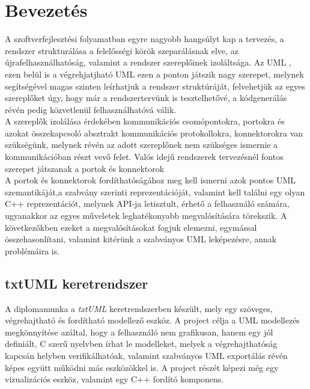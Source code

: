 \documentclass[a4paper,12pt]{report}
\begin{document}
\tableofcontents

\chapter{Bevezetés}
A szoftverfejlesztési folyamatban egyre nagyobb hangsúlyt kap a tervezés, a rendszer strukturálása a felelősségi körök szeparálásnak elve, az újrafelhasználhatóság, valamint a rendszer szereplőinek izoláltsága. Az UML \cite{uml_omg}, ezen belül is a végrehjatjható UML ezen a ponton játszik nagy szerepet, melynek segítségével magas szinten leírhatjuk a rendszer struktúráját, felvehetjük az egyes szereplőket úgy, hogy már a rendszertervünk is tesztelhetővé, a kódgenerálás révén pedig közvetlenül felhasználhatóvá válik. \\ A szereplők izolálása érdekében kommunikációs csomópontokra, portokra és azokat összekapcsoló absztrakt kommunikációs protokollokra, konnektorokra van szükségünk, melynek révén az adott szereplőnek nem szükséges ismernie a kommunikációban részt vevő felet. Valós idejű rendszerek tervezésnél fontos szerepet játszanak a portok és konnektorok \cite{uml_real}\\ 
A portok és konnektorok fordíthatóságához meg kell ismerni azok pontos UML szemantikáját,a szabvány szerinti reprezentációját, valamint kell találni egy olyan C++ reprezentációt, melynek API-ja letisztult, érhető a felhasználó számára, ugyanakkor az egyes műveletek leghatékonyabb megvalósítására törekszik. A következőkben ezeket a megvalósításokat fogjuk elemezni, egymással összehasonlítani, valamint kitérünk a szabványos UML leképezésre, annak problémáira is. \\

\section{txtUML keretrendszer}
A diplomamunka a \textit{txtUML} keretrendszerben készült, mely egy szöveges, végrehajtható és fordítható modellező eszköz. A project célja a UML modellezés megkönnyítése azáltal, hogy a felhasználó nem grafikusan, hanem egy jól definiált, C szerű nyelvben írhat le modelleket, melyek a végrehajthatóság kapcsán helyben verifikálhatóak, valamint szabványos UML exportálás révén képes együtt működni más eszközökkel is. A project részét képezi még egy vizualizációs eszköz, valamint egy C++ fordító komponens.\\
\end{document}

